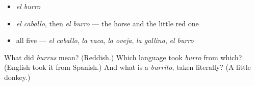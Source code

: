 \begin{itemize}
\raggedright
  \item \emph{el burro}
  \item \emph{el caballo}, then \emph{el burro} — the horse and the little red one
  \item all five — \emph{el caballo}, \emph{la vaca}, \emph{la oveja}, \emph{la gallina}, \emph{el burro}
\end{itemize}

\begin{tcolorbox}[breakable,colback=teal!4,colframe=teal!35!black,title={Before you move on}]
What did \emph{burrus} mean? (Reddish.) Which language took \emph{burro} from which? (English took it from Spanish.) And what is a \emph{burrito}, taken literally? (A little donkey.)
\end{tcolorbox}
